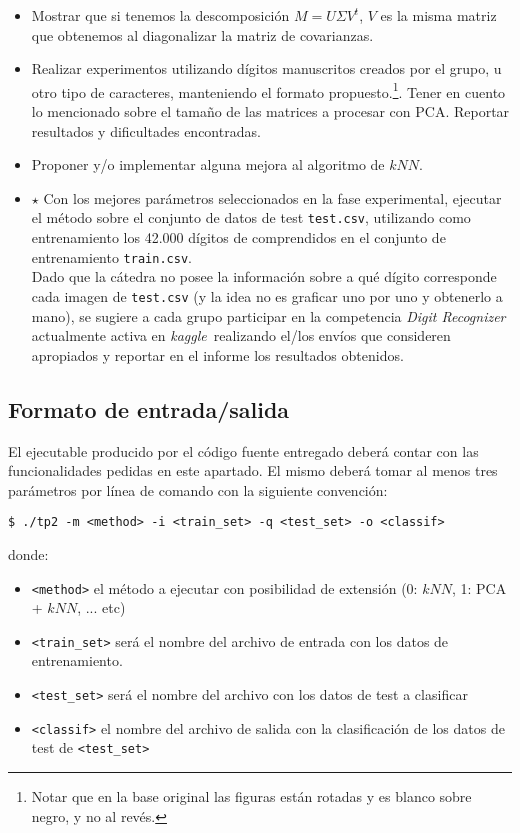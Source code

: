 \documentclass[11pt, a4paper]{article}
\newcommand{\kaggle}{\textit{kaggle}}
\begin{document}
\begin{itemize}
\item Mostrar que si tenemos la descomposición $M = U\Sigma V^t$, $V$ es la misma matriz que obtenemos al diagonalizar la matriz de covarianzas.
\item Realizar experimentos utilizando dígitos manuscritos creados por el grupo, u otro tipo de caracteres, manteniendo el formato propuesto.\footnote{Notar que en la base original las figuras están rotadas y es blanco sobre negro, y no al revés.}. Tener en cuento lo mencionado sobre el tamaño de las matrices a procesar con PCA. Reportar resultados y dificultades encontradas.
\item Proponer y/o implementar alguna mejora al algoritmo de $kNN$.
\item $\star$ Con los mejores parámetros seleccionados en la fase experimental, ejecutar el método sobre el conjunto de datos de test \verb|test.csv|, utilizando como entrenamiento los 42.000 dígitos de comprendidos en el conjunto de entrenamiento \verb|train.csv|.\\
%
Dado que la cátedra no posee la información sobre a qué dígito corresponde cada imagen de \verb|test.csv| (y la idea no es graficar uno por uno y obtenerlo a mano), se sugiere a cada grupo participar en la competencia \emph{Digit Recognizer} actualmente activa en \kaggle\ realizando el/los envíos que consideren apropiados y reportar en el informe los resultados obtenidos.


\end{itemize}



\subsection*{Formato de entrada/salida}

El ejecutable producido por el código fuente entregado deberá contar con las funcionalidades pedidas en este apartado.
%
El mismo deberá tomar al menos tres parámetros por línea de comando con la siguiente convención:
\begin{verbatim}
$ ./tp2 -m <method> -i <train_set> -q <test_set> -o <classif>
\end{verbatim}
%
donde:
\begin{itemize}
 \item \verb|<method>| el método a ejecutar con posibilidad de extensión (0: $kNN$, 1: PCA + $kNN$, ... etc)
 \item \verb|<train_set>| será el nombre del archivo de entrada con los datos de entrenamiento.
 \item \verb|<test_set>| será el nombre del archivo con los datos de test a clasificar
 \item \verb|<classif>| el nombre del archivo de salida con la clasificación de los datos de test de \verb|<test_set>|
\end{itemize}
\end{document}
